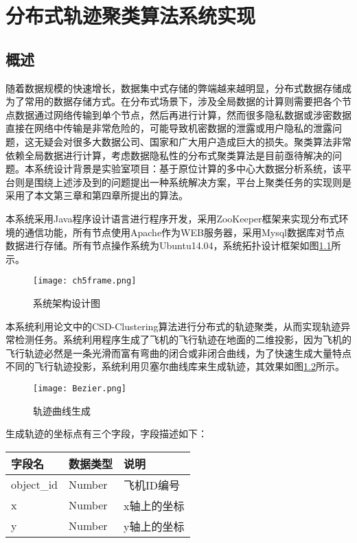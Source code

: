 \chapter{分布式轨迹聚类算法系统实现}

\section{概述}

随着数据规模的快速增长，数据集中式存储的弊端越来越明显，分布式数据存储成为了常用的数据存储方式。在分布式场景下，涉及全局数据的计算则需要把各个节点数据通过网络传输到单个节点，然后再进行计算，然而很多隐私数据或涉密数据直接在网络中传输是非常危险的，可能导致机密数据的泄露或用户隐私的泄露问题，这无疑会对很多大数据公司、国家和广大用户造成巨大的损失。聚类算法非常依赖全局数据进行计算，考虑数据隐私性的分布式聚类算法是目前亟待解决的问题。本系统设计背景是实验室项目：基于原位计算的多中心大数据分析系统，该平台则是围绕上述涉及到的问题提出一种系统解决方案，平台上聚类任务的实现则是采用了本文第三章和第四章所提出的算法。

本系统采用Java程序设计语言进行程序开发，采用ZooKeeper框架来实现分布式环境的通信功能，所有节点使用Apache作为WEB服务器，采用Mysql数据库对节点数据进行存储。所有节点操作系统为Ubuntu14.04，系统拓扑设计框架如图\ref{ch5frame}所示。
\begin{figure}[H]
	\texttt{[image: ch5frame.png]}
	\caption{系统架构设计图}
	\label{ch5frame}
\end{figure}

本系统利用论文中的CSD-Clustering算法进行分布式的轨迹聚类，从而实现轨迹异常检测任务。系统利用程序生成了飞机的飞行轨迹在地面的二维投影，因为飞机的飞行轨迹必然是一条光滑而富有弯曲的闭合或非闭合曲线，为了快速生成大量特点不同的飞行轨迹投影，系统利用贝塞尔曲线库来生成轨迹，其效果如图\ref{bezier}所示。
\begin{figure}[H]
	\texttt{[image: Bezier.png]}
	\caption{轨迹曲线生成}
	\label{bezier}
\end{figure}

生成轨迹的坐标点有三个字段，字段描述如下：
\begin{table}[H]
\begin{tabular}{|l|l|l|}
\hline
字段名        & 数据类型   & 说明     \\ \hline
object\_id & Number & 飞机ID编号 \\ \hline
x          & Number & x轴上的坐标 \\ \hline
y          & Number & y轴上的坐标 \\ \hline
\end{tabular}
\end{table}

